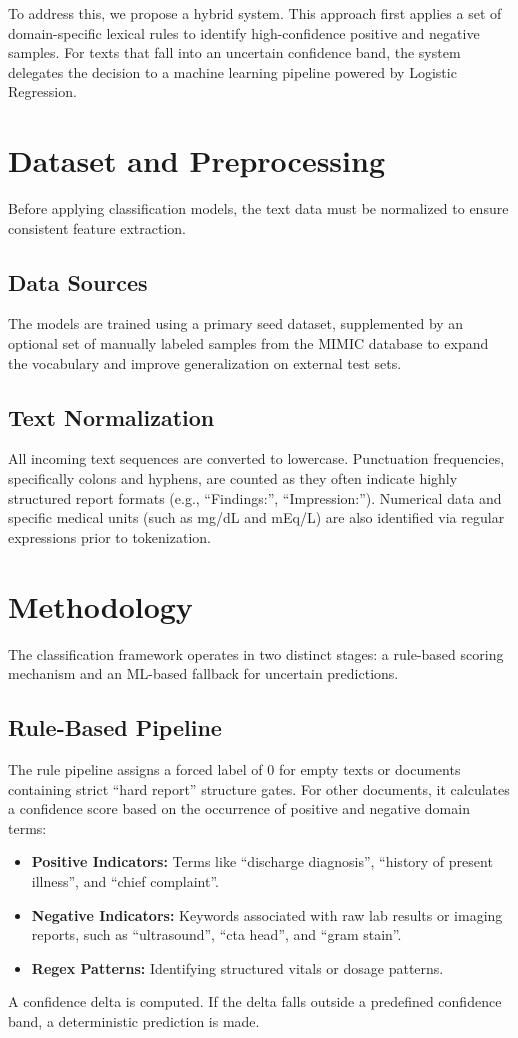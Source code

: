 \documentclass[conference]{IEEEtran}
\begin{document}
To address this, we propose a hybrid system. This approach first applies a set of domain-specific lexical rules to identify high-confidence positive and negative samples. For texts that fall into an uncertain confidence band, the system delegates the decision to a machine learning pipeline powered by Logistic Regression.

\section{Dataset and Preprocessing}
Before applying classification models, the text data must be normalized to ensure consistent feature extraction.

\subsection{Data Sources}
The models are trained using a primary seed dataset, supplemented by an optional set of manually labeled samples from the MIMIC database to expand the vocabulary and improve generalization on external test sets.

\subsection{Text Normalization}
All incoming text sequences are converted to lowercase. Punctuation frequencies, specifically colons and hyphens, are counted as they often indicate highly structured report formats (e.g., ``Findings:'', ``Impression:''). Numerical data and specific medical units (such as mg/dL and mEq/L) are also identified via regular expressions prior to tokenization.

\section{Methodology}
The classification framework operates in two distinct stages: a rule-based scoring mechanism and an ML-based fallback for uncertain predictions.

\subsection{Rule-Based Pipeline}\label{AA}
The rule pipeline assigns a forced label of $0$ for empty texts or documents containing strict ``hard report'' structure gates. For other documents, it calculates a confidence score based on the occurrence of positive and negative domain terms:
\begin{itemize}
\item \textbf{Positive Indicators:} Terms like ``discharge diagnosis'', ``history of present illness'', and ``chief complaint''.
\item \textbf{Negative Indicators:} Keywords associated with raw lab results or imaging reports, such as ``ultrasound'', ``cta head'', and ``gram stain''.
\item \textbf{Regex Patterns:} Identifying structured vitals or dosage patterns.
\end{itemize}
A confidence delta is computed. If the delta falls outside a predefined confidence band, a deterministic prediction is made.
\end{document}
